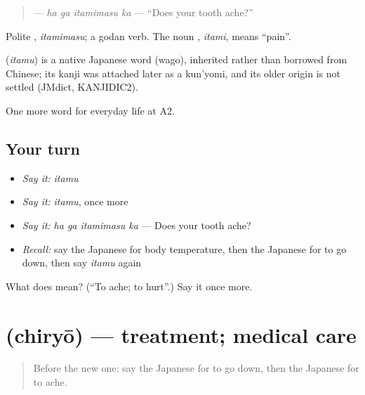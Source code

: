 \begin{quote}
\textbf{ } — \emph{ha ga itamimasu ka} — \textquotedblleft{}Does your tooth ache?\textquotedblright{}
\end{quote}

Polite \textbf{}, \emph{itamimasu}; a godan verb. The noun \textbf{}, \emph{itami}, means \textquotedblleft{}pain\textquotedblright{}.

\begin{cousinweb}
\textbf{} (\emph{itamu}) is a native Japanese word (wago), inherited rather than borrowed from Chinese; its kanji was attached later as a kun'yomi, and its older origin is not settled (JMdict, KANJIDIC2).
\end{cousinweb}

\begin{grammarlens}[title={What you've built}]
One more word for everyday life at A2.
\end{grammarlens}

\subsection*{Your turn}
\begin{itemize}
\raggedright
  \item \emph{Say it:} \emph{itamu}
  \item \emph{Say it:} \emph{itamu}, once more
  \item \emph{Say it:} \emph{ha ga itamimasu ka} — Does your tooth ache?
  \item \emph{Recall:} say the Japanese for body temperature, then the Japanese for to go down, then say \emph{itamu} again
\end{itemize}

\begin{tcolorbox}[breakable,colback=teal!4,colframe=teal!35!black,title={Before you move on}]
What does  mean? (\textquotedblleft{}To ache; to hurt\textquotedblright{}.) Say it once more.
\end{tcolorbox}
\section[\texorpdfstring{\ja{ちりょう} (chiryō)}{ちりょう (chiryō)}]{ (chiryō) — treatment; medical care}

\label{lesson:JA-C221-chiryou}



\begin{quote}
Before the new one: say the Japanese for to go down, then the Japanese for to ache.
\end{quote}

